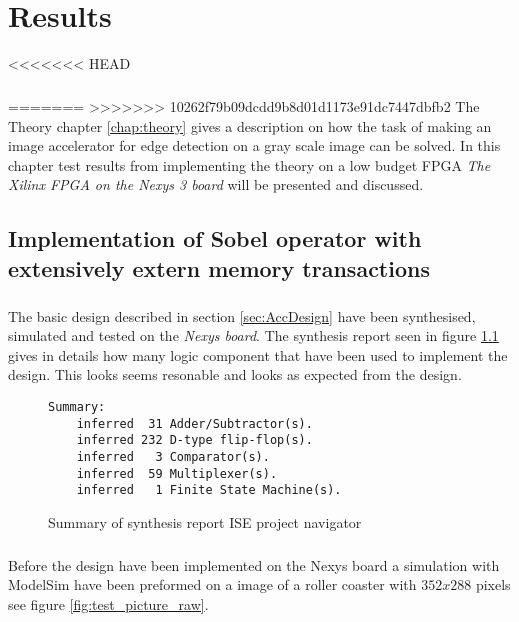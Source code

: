 \chapter{Results}
<<<<<<< HEAD
\paragraph*{}
=======
\label{chap:Results}
>>>>>>> 10262f79b09dcdd9b8d01d1173e91dc7447dbfb2
The Theory chapter \ref{chap:theory} gives a description on how the task of making an image accelerator for edge detection on a gray scale image can be solved. In this chapter test results from implementing the theory on a low budget FPGA \textit{The Xilinx FPGA on the Nexys 3 board} will be presented and discussed.  

\section{Implementation of Sobel operator with extensively extern memory transactions}
\paragraph*{}
The basic design described in section \ref{sec:AccDesign} have been synthesised, simulated and tested on the \textit{Nexys board}. The synthesis report seen in figure \ref{fig:sum_synthesis_report} gives in details how many logic component that have been used to implement the design. This looks seems resonable and looks as expected from the design.  

\begin{figure}[H]
\centering
\begin{BVerbatim}
Summary:
    inferred  31 Adder/Subtractor(s).
    inferred 232 D-type flip-flop(s).
    inferred   3 Comparator(s).
    inferred  59 Multiplexer(s).
    inferred   1 Finite State Machine(s).
\end{BVerbatim}
\caption{Summary of synthesis report ISE project navigator}
\label{fig:sum_synthesis_report}
\end{figure}

\paragraph*{}
Before the design have been implemented on the Nexys board a simulation with ModelSim have been preformed on a image of a roller coaster with $352x288$ pixels see figure \ref{fig:test_picture_raw}. 

